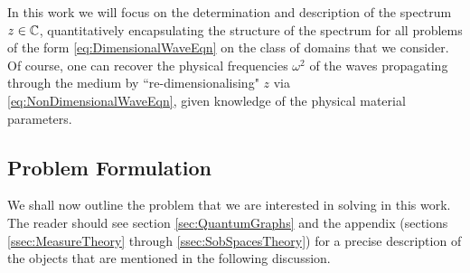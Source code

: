 In this work we will focus on the determination and description of the spectrum $z\in\mathbb{C}$, quantitatively encapsulating the structure of the spectrum for all problems of the form \eqref{eq:DimensionalWaveEqn} on the class of domains that we consider.
Of course, one can recover the physical frequencies $\omega^2$ of the waves propagating through the medium by ``re-dimensionalising" $z$ via \eqref{eq:NonDimensionalWaveEqn}, given knowledge of the physical material parameters.

\subsection{Problem Formulation} \label{ssec:OurSystem}
We shall now outline the problem that we are interested in solving in this work.
The reader should see section \ref{sec:QuantumGraphs} and the appendix (sections \ref{ssec:MeasureTheory} through \ref{ssec:SobSpacesTheory}) for a precise description of the objects that are mentioned in the following discussion. \newline

